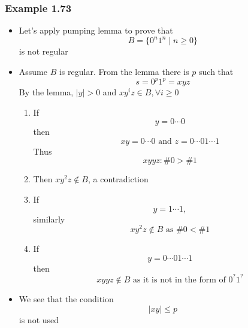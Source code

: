 \begin{frame}[allowframebreaks] \frametitle{Example 1.73}
  \begin{itemize}
  \item Let's apply pumping lemma to prove that
    \begin{equation*}
    B=\{0^n 1^n\mid
    n \geq 0\}
  \end{equation*}
    is not regular
  \item Assume $B$ is regular. From the lemma there is
    $p$ such that
  \begin{equation*}
    s = 0^p 1^p = xy z
  \end{equation*}
  By the lemma, $|y| > 0$ and $xy^i z \in B, \forall i \geq 0$
\begin{enumerate}
\item If
  \begin{equation*}
  y=0 \cdots 0
\end{equation*}
then
\begin{equation*}
xy = 0 \cdots 0 \text{ and }
z = 0 \cdots 0 1 \cdots 1
\end{equation*}
Thus
\begin{equation*}
xyyz: \#0 > \#1
\end{equation*}
\item Then $xy^2 z \notin B$, a contradiction
\item If
  \begin{equation*}
y = 1 \cdots 1,
\end{equation*}
similarly
\begin{equation*}
  xy^2z \notin B \text{ as } \# 0 < \# 1
\end{equation*}

\item If
  \begin{equation*}
y = 0 \cdots 0 1 \cdots 1
\end{equation*}
then
\begin{equation*}
xyyz \notin B \text{ as it is not in the form of } 0^? 1^?
\end{equation*}
\end{enumerate}
\item We see that the condition
  \begin{equation*}
    |xy| \leq p
  \end{equation*}
is not used
\end{itemize}\end{frame}


